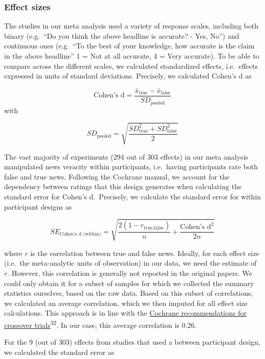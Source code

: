 \documentclass[
  man]{apa6}
\begin{document}
\subsubsection{Effect sizes}\label{effect-sizes}

The studies in our meta analysis used a variety of response scales, including both binary (e.g.~``Do you think the above headline is accurate? - Yes, No'') and continuous ones (e.g.~``To the best of your knowledge, how accurate is the claim in the above headline'' 1 = Not at all accurate, 4 = Very accurate). To be able to compare across the different scales, we calculated standardized effects, i.e.~effects expressed in units of standard deviations. Precisely, we calculated Cohen's d as

\[
\text{Cohen's d} = \frac{\bar{x}_{\text{true}} - \bar{x}_{\text{false}}}{SD_{\text{pooled}}}
\] with

\[
SD_{\text{pooled}} = \sqrt{\frac{SD_{\text{true}}^2+SD_{\text{false}}^2}{2}}
\]

The vast majority of experiments (294 out of 303 effects) in our meta analysis manipulated news veracity within participants, i.e.~having participants rate both false and true news. Following the Cochrane manual, we account for the dependency between ratings that this design generates when calculating the standard error for Cohen's d.~Precisely, we calculate the standard error for within participant designs as

\[
SE_{\text{Cohen's d (within)}} = \sqrt{\frac{2(1-r_{\text{true},\text{false}})}{n}+\frac{\text{Cohen's d}^2}{2n}}
\]

where \(r\) is the correlation between true and false news. Ideally, for each effect size (i.e.~the meta-analytic units of observation) in our data, we need the estimate of \(r\). However, this correlation is generally not reported in the original papers. We could only obtain it for a subset of samples for which we collected the summary statistics ourselves, based on the raw data. Based on this subset of correlations, we calculated an average correlation, which we then imputed for all effect size calculations. This approach is in line with the \href{https://training.cochrane.org/handbook/current/chapter-23\#section-23-2-7-3}{Cochrane recommendations for crossover trials}\textsuperscript{32}. In our case, this average correlation is 0.26.

For the 9 (out of 303) effects from studies that used a between participant design, we calculated the standard error as
\end{document}

